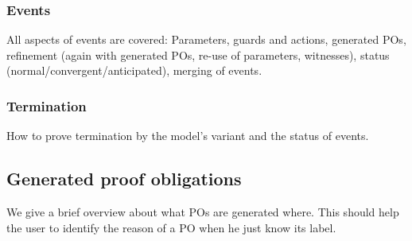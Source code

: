 \subsubsection{Events}

All aspects of events are covered: Parameters, guards and actions, generated POs, refinement (again with generated POs, re-use of parameters, witnesses), status (normal/convergent/anticipated), merging of events.

\subsubsection{Termination}

How to prove termination by the model's variant and the status of events.
  
\subsection{Generated proof obligations}

We give a brief overview about what POs are generated where. This should help the user to identify the reason of a PO when he just know its label.


